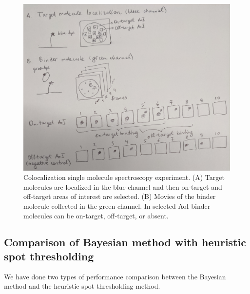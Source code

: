 \begin{figure}
\includegraphics[width=\linewidth]{figures/figure1.jpg}
\caption{Colocalization single molecule spectroscopy experiment. (A) Target molecules are localized in the blue channel and then on-target and off-target areas of interest are selected. (B) Movies of the binder molecule collected in the green channel. In selected AoI binder molecules can be on-target, off-target, or absent.}
\label{fig:view}
\end{figure}

\subsection{Comparison of Bayesian method with heuristic spot thresholding}

We have done two types of performance comparison between the Bayesian method and the heuristic spot thresholding method.

